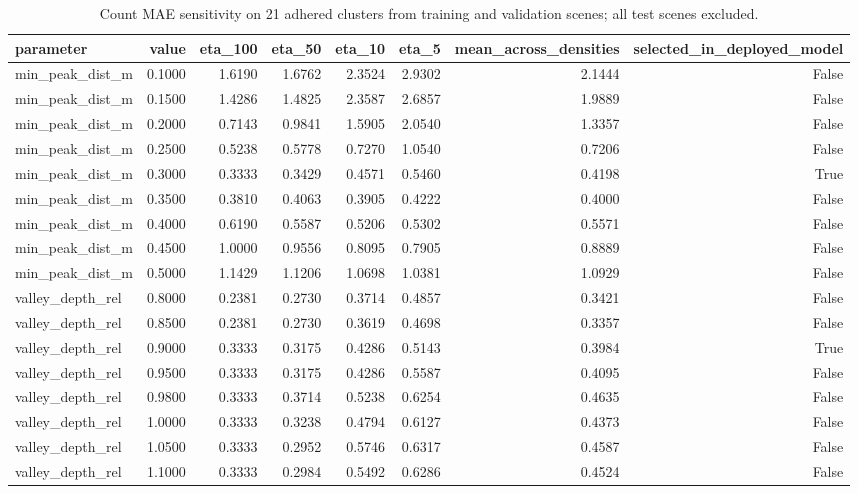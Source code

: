 \begin{table}
\caption{Count MAE sensitivity on 21 adhered clusters from training and validation scenes; all test scenes excluded.}
\label{tab:sensitivity}
\begin{tabular}{lrrrrrrr}
\toprule
parameter & value & eta\_100 & eta\_50 & eta\_10 & eta\_5 & mean\_across\_densities & selected\_in\_deployed\_model \\
\midrule
min\_peak\_dist\_m & 0.1000 & 1.6190 & 1.6762 & 2.3524 & 2.9302 & 2.1444 & False \\
min\_peak\_dist\_m & 0.1500 & 1.4286 & 1.4825 & 2.3587 & 2.6857 & 1.9889 & False \\
min\_peak\_dist\_m & 0.2000 & 0.7143 & 0.9841 & 1.5905 & 2.0540 & 1.3357 & False \\
min\_peak\_dist\_m & 0.2500 & 0.5238 & 0.5778 & 0.7270 & 1.0540 & 0.7206 & False \\
min\_peak\_dist\_m & 0.3000 & 0.3333 & 0.3429 & 0.4571 & 0.5460 & 0.4198 & True \\
min\_peak\_dist\_m & 0.3500 & 0.3810 & 0.4063 & 0.3905 & 0.4222 & 0.4000 & False \\
min\_peak\_dist\_m & 0.4000 & 0.6190 & 0.5587 & 0.5206 & 0.5302 & 0.5571 & False \\
min\_peak\_dist\_m & 0.4500 & 1.0000 & 0.9556 & 0.8095 & 0.7905 & 0.8889 & False \\
min\_peak\_dist\_m & 0.5000 & 1.1429 & 1.1206 & 1.0698 & 1.0381 & 1.0929 & False \\
valley\_depth\_rel & 0.8000 & 0.2381 & 0.2730 & 0.3714 & 0.4857 & 0.3421 & False \\
valley\_depth\_rel & 0.8500 & 0.2381 & 0.2730 & 0.3619 & 0.4698 & 0.3357 & False \\
valley\_depth\_rel & 0.9000 & 0.3333 & 0.3175 & 0.4286 & 0.5143 & 0.3984 & True \\
valley\_depth\_rel & 0.9500 & 0.3333 & 0.3175 & 0.4286 & 0.5587 & 0.4095 & False \\
valley\_depth\_rel & 0.9800 & 0.3333 & 0.3714 & 0.5238 & 0.6254 & 0.4635 & False \\
valley\_depth\_rel & 1.0000 & 0.3333 & 0.3238 & 0.4794 & 0.6127 & 0.4373 & False \\
valley\_depth\_rel & 1.0500 & 0.3333 & 0.2952 & 0.5746 & 0.6317 & 0.4587 & False \\
valley\_depth\_rel & 1.1000 & 0.3333 & 0.2984 & 0.5492 & 0.6286 & 0.4524 & False \\
\bottomrule
\end{tabular}
\end{table}
